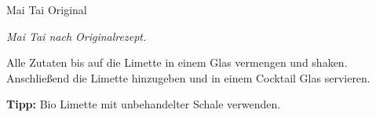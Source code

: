 \begin{recipe}{Mai Tai Original}{}{}

  \freeform
  \textit{Mai Tai nach Originalrezept.}


  Alle Zutaten bis auf die Limette in einem Glas vermengen und shaken.
  Anschließend die Limette hinzugeben und in einem Cocktail Glas servieren.

  \freeform
  \hrulefill

  \freeform
  \textbf{Tipp:}
  Bio Limette mit unbehandelter Schale verwenden.

\end{recipe}
